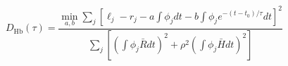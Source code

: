 \documentclass{article}
\begin{document}
\fontsize{22}{29}\selectfont
\[
D_{\mathrm{Hb}}(\tau)=\frac{\min_{a,b}\sum_j[\ell_j-r_j-a\!\int\phi_jdt-b\!\int\phi_je^{-(t-t_0)/\tau}dt]^2}{\sum_j[(\int\phi_j\bar Rdt)^2+\rho^2(\int\phi_j\bar Hdt)^2]}
\]
\end{document}
